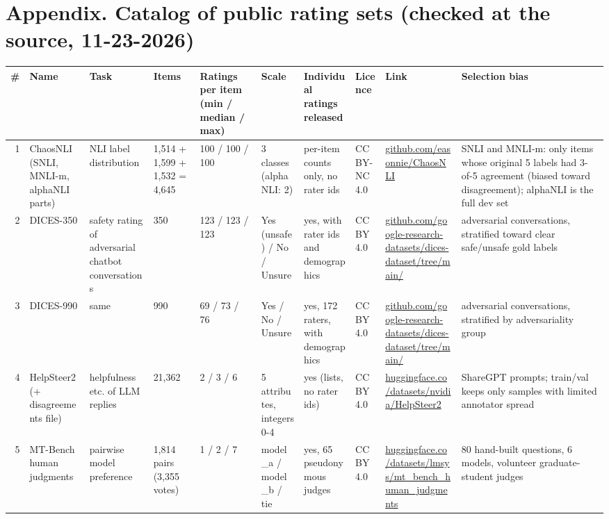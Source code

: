 \documentclass[10pt]{article}
\begin{document}
\section*{Appendix. Catalog of public rating sets (checked at the source, 11-23-2026)}
\tiny\setlength{\tabcolsep}{2pt}
\begin{longtable}{@{}r p{1.15in} p{1.0in} p{0.75in} p{0.8in} p{0.8in} p{0.9in} p{0.8in} p{1.2in} p{1.5in}@{}}
\toprule \# & Name & Task & Items & Ratings per item (min / median / max) & Scale & Individual ratings released & Licence & Link & Selection bias \\ \midrule\endhead
1 & ChaosNLI (SNLI, MNLI-m, alphaNLI parts) & NLI label distribution & 1,514 + 1,599 + 1,532 = 4,645 & 100 / 100 / 100 & 3 classes (alphaNLI: 2) & per-item counts only, no rater ids & CC BY-NC 4.0 & \href{https://github.com/easonnie/ChaosNLI}{github.com/\allowbreak{}easonnie/\allowbreak{}ChaosNLI} & SNLI and MNLI-m: only items whose original 5 labels had 3-of-5 agreement (biased toward disagreement); alphaNLI is the full dev set \\
2 & DICES-350 & safety rating of adversarial chatbot conversations & 350 & 123 / 123 / 123 & Yes (unsafe) / No / Unsure & yes, with rater ids and demographics & CC BY 4.0 & \href{https://github.com/google-research-datasets/dices-dataset/tree/main/350}{github.com/\allowbreak{}google-\allowbreak{}research-\allowbreak{}datasets/\allowbreak{}dices-\allowbreak{}dataset/\allowbreak{}tree/\allowbreak{}main/\allowbreak{}} & adversarial conversations, stratified toward clear safe/unsafe gold labels \\
3 & DICES-990 & same & 990 & 69 / 73 / 76 & Yes / No / Unsure & yes, 172 raters, with demographics & CC BY 4.0 & \href{https://github.com/google-research-datasets/dices-dataset/tree/main/990}{github.com/\allowbreak{}google-\allowbreak{}research-\allowbreak{}datasets/\allowbreak{}dices-\allowbreak{}dataset/\allowbreak{}tree/\allowbreak{}main/\allowbreak{}} & adversarial conversations, stratified by adversariality group \\
4 & HelpSteer2 (+ disagreements file) & helpfulness etc. of LLM replies & 21,362 & 2 / 3 / 6 & 5 attributes, integers 0-4 & yes (lists, no rater ids) & CC BY 4.0 & \href{https://huggingface.co/datasets/nvidia/HelpSteer2}{huggingface.co/\allowbreak{}datasets/\allowbreak{}nvidia/\allowbreak{}HelpSteer2} & ShareGPT prompts; train/val keeps only samples with limited annotator spread \\
5 & MT-Bench human judgments & pairwise model preference & 1,814 pairs (3,355 votes) & 1 / 2 / 7 & model\_a / model\_b / tie & yes, 65 pseudonymous judges & CC BY 4.0 & \href{https://huggingface.co/datasets/lmsys/mt_bench_human_judgments}{huggingface.co/\allowbreak{}datasets/\allowbreak{}lmsys/\allowbreak{}mt\_bench\_human\_judgments} & 80 hand-built questions, 6 models, volunteer graduate-student judges \\

\end{longtable}
\end{document}

